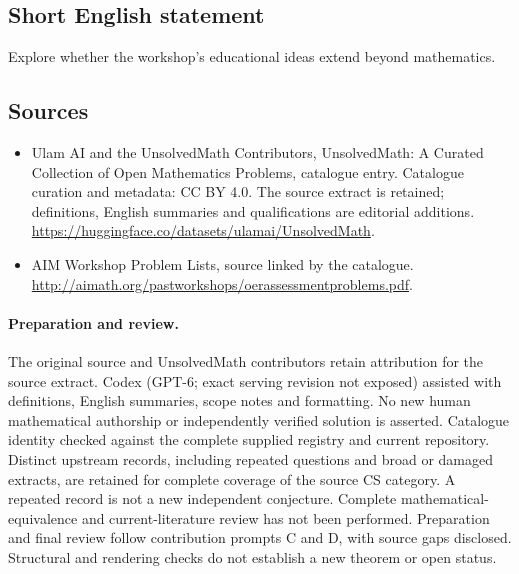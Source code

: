 \documentclass[11pt]{article}
\begin{document}
\subsection{Short English statement}
Explore whether the workshop's educational ideas extend beyond mathematics.
\subsection{Sources}
\begin{itemize}
\item[\hypertarget{source:statement:1}{S1}] Ulam AI and the UnsolvedMath Contributors, UnsolvedMath: A Curated Collection of Open Mathematics Problems, catalogue entry. Catalogue curation and metadata: CC BY 4.0. The source extract is retained; definitions, English summaries and qualifications are editorial additions.
\url{https://huggingface.co/datasets/ulamai/UnsolvedMath}.
\item[\hypertarget{source:statement:2}{S2}] AIM Workshop Problem Lists, source linked by the catalogue.
\url{http://aimath.org/pastworkshops/oerassessmentproblems.pdf}.
\end{itemize}
\paragraph{Preparation and review.}
The original source and UnsolvedMath contributors retain attribution for the source extract. Codex (GPT-6; exact serving revision not exposed) assisted with definitions, English summaries, scope notes and formatting. No new human mathematical authorship or independently verified solution is asserted. Catalogue identity checked against the complete supplied registry and current repository. Distinct upstream records, including repeated questions and broad or damaged extracts, are retained for complete coverage of the source CS category. A repeated record is not a new independent conjecture. Complete mathematical-equivalence and current-literature review has not been performed. Preparation and final review follow contribution prompts C and D, with source gaps disclosed. Structural and rendering checks do not establish a new theorem or open status.
\label{end:statement}
\end{document}
